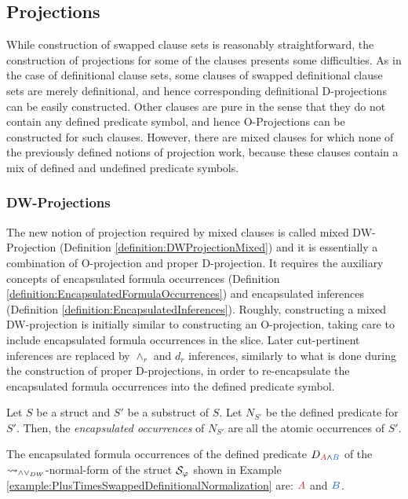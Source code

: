 \subsection{Projections}

While construction of swapped clause sets is reasonably straightforward, the construction of projections for some of the clauses presents some difficulties. As in the case of definitional clause sets, some clauses of swapped definitional clause sets are merely definitional, and hence corresponding definitional D-projections can be easily constructed. Other clauses are pure in the sense that they do not contain any defined predicate symbol, and hence O-Projections can be constructed for such clauses. However, there are mixed clauses for which none of the previously defined notions of projection work, because these clauses contain a mix of defined and undefined predicate symbols. 

\subsubsection{DW-Projections}

The new notion of projection required by mixed clauses is called mixed DW-Projection (Definition \ref{definition:DWProjectionMixed}) and it is essentially a combination of O-projection and proper D-projection. It requires the auxiliary concepts of encapsulated formula occurrences (Definition \ref{definition:EncapsulatedFormulaOccurrences}) and encapsulated inferences (Definition \ref{definition:EncapsulatedInferences}). Roughly, constructing a mixed DW-projection is initially similar to constructing an O-projection, taking care to include encapsulated formula occurrences in the slice. Later cut-pertinent inferences are replaced by $\wedge_r$ and $d_r$ inferences, similarly to what is done during the construction of proper D-projections, in order to re-encapsulate the encapsulated formula occurrences into the defined predicate symbol.

\begin{definition}
\label{definition:EncapsulatedFormulaOccurrences}
Let $S$ be a struct and $S'$ be a substruct of $S$. Let $N_{S'}$ be the defined predicate for $S'$. Then, the \emph{encapsulated occurrences} of $N_{S'}$ are all the atomic occurrences of $S'$.
\end{definition}

\begin{example}
\label{example:EncapsulatedFormulaOccurrences}


The encapsulated formula occurrences of the defined predicate $D_{\hA{A} \structplus \hB{B}}$ of the $\leadsto_{\wedge\vee_{DW}}$-normal-form of the struct $\mathcal{S}_{\varphi}$ shown in Example \ref{example:PlusTimesSwappedDefinitionalNormalization} are: $\hA{A}$ and $\hB{B}$.
\end{example}


